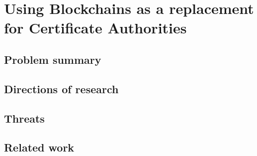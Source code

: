 \section{Using Blockchains as a replacement for Certificate Authorities}

\subsection*{Problem summary}
\subsection*{Directions of research}
\subsection*{Threats}
\subsection*{Related work}

